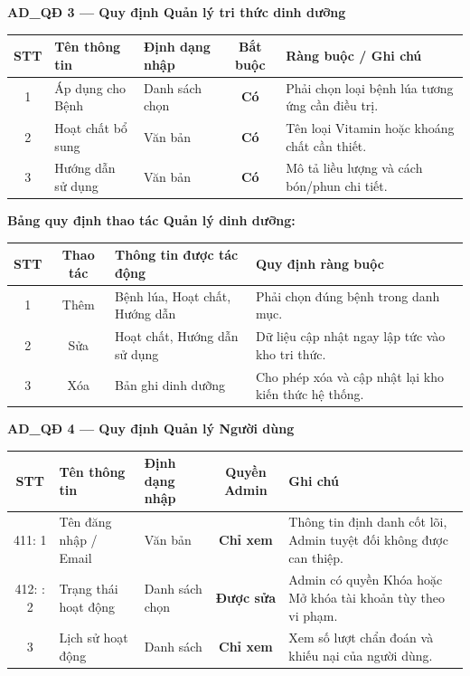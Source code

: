 \documentclass[12pt,a4paper]{article}
\begin{document}
\vspace{0.4cm}
\noindent\textbf{AD\_QĐ 3 --- Quy định Quản lý tri thức dinh dưỡng}
\begin{longtable}{|c|l|p{2.5cm}|c|p{5cm}|}
\hline
\rowcolor{headerblue}
\textbf{STT} & \textbf{Tên thông tin} & \textbf{Định dạng nhập} & \textbf{Bắt buộc} & \textbf{Ràng buộc / Ghi chú} \\
\hline
\endhead
1 & Áp dụng cho Bệnh & Danh sách chọn & \textbf{Có} & Phải chọn loại bệnh lúa tương ứng cần điều trị. \\
\hline
2 & Hoạt chất bổ sung & Văn bản & \textbf{Có} & Tên loại Vitamin hoặc khoáng chất cần thiết. \\
\hline
3 & Hướng dẫn sử dụng & Văn bản & \textbf{Có} & Mô tả liều lượng và cách bón/phun chi tiết. \\
\hline
\end{longtable}
\noindent\textbf{Bảng quy định thao tác Quản lý dinh dưỡng:}
\begin{longtable}{|c|c|p{4cm}|p{6cm}|}
\hline
\rowcolor{headerblue}
\textbf{STT} & \textbf{Thao tác} & \textbf{Thông tin được tác động} & \textbf{Quy định ràng buộc} \\
\hline
1 & Thêm & Bệnh lúa, Hoạt chất, Hướng dẫn & Phải chọn đúng bệnh trong danh mục. \\
\hline
2 & Sửa & Hoạt chất, Hướng dẫn sử dụng & Dữ liệu cập nhật ngay lập tức vào kho tri thức. \\
\hline
3 & Xóa & Bản ghi dinh dưỡng & Cho phép xóa và cập nhật lại kho kiến thức hệ thống. \\
\hline
\end{longtable}

\vspace{0.4cm}
\noindent\textbf{AD\_QĐ 4 --- Quy định Quản lý Người dùng}
\begin{longtable}{|c|l|p{2.5cm}|c|p{5cm}|}
\hline
\rowcolor{headerblue}
\textbf{STT} & \textbf{Tên thông tin} & \textbf{Định dạng nhập} & \textbf{Quyền Admin} & \textbf{Ghi chú} \\
\hline
\endhead
411: 1 & Tên đăng nhập / Email & Văn bản & \textbf{Chỉ xem} & Thông tin định danh cốt lõi, Admin tuyệt đối không được can thiệp. \\
412: \hline
413: 2 & Trạng thái hoạt động & Danh sách chọn & \textbf{Được sửa} & Admin có quyền Khóa hoặc Mở khóa tài khoản tùy theo vi phạm. \\
\hline
3 & Lịch sử hoạt động & Danh sách & \textbf{Chỉ xem} & Xem số lượt chẩn đoán và khiếu nại của người dùng. \\
\hline
\end{longtable}
\end{document}
